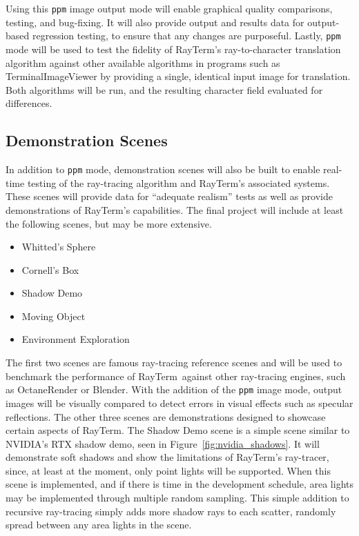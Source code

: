 \documentclass[11pt]{article}
\newcommand{\name}{{\sc RayTerm}}
\begin{document}
Using this \texttt{ppm} image output mode will enable graphical quality comparisons, testing, and bug-fixing.
It will also provide output and results data for output-based regression testing, to ensure that any changes are purposeful.
Lastly, \texttt{ppm} mode will be used to test the fidelity of \name's ray-to-character translation algorithm against other available algorithms in programs such as TerminalImageViewer by providing a single, identical input image for translation.
Both algorithms will be run, and the resulting character field evaluated for differences.


\subsection{Demonstration Scenes}
\label{sec:evaluate:demo_scenes}

In addition to \texttt{ppm} mode, demonstration scenes will also be built to enable real-time testing of the ray-tracing algorithm and \name's associated systems.
These scenes will provide data for ``adequate realism'' tests as well as provide demonstrations of \name's capabilities.
The final project will include at least the following scenes, but may be more extensive.

\begin{itemize}
  \setlength\itemsep{-0.25em}
  \item Whitted's Sphere
  \item Cornell's Box
  \item Shadow Demo
  \item Moving Object
  \item Environment Exploration
\end{itemize}

The first two scenes are famous ray-tracing reference scenes and will be used to benchmark the performance of \name\ against other ray-tracing engines, such as OctaneRender or Blender.
With the addition of the {\texttt{ppm}} image mode, output images will be visually compared to detect errors in visual effects such as specular reflections.
The other three scenes are demonstrations designed to showcase certain aspects of \name.
The Shadow Demo scene is a simple scene similar to NVIDIA's RTX shadow demo, seen in Figure~\ref{fig:nvidia_shadows}.
It will demonstrate soft shadows and show the limitations of \name's ray-tracer, since, at least at the moment, only point lights will be supported.
When this scene is implemented, and if there is time in the development schedule, area lights may be implemented through multiple random sampling.
This simple addition to recursive ray-tracing simply adds more shadow rays to each scatter, randomly spread between any area lights in the scene.
\end{document}

